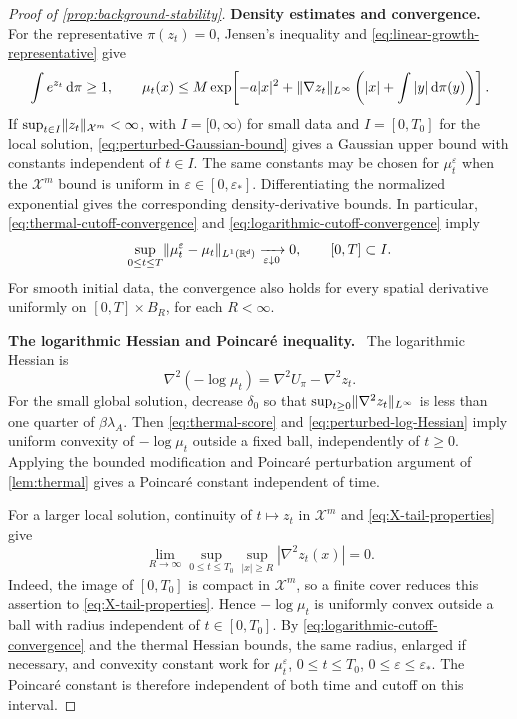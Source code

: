 \documentclass[11pt,reqno]{amsart}
\numberwithin{equation}{section}
\theoremstyle{plain}
\theoremstyle{remark}
\DeclarePairedDelimiter{\norm}{\lVert}{\rVert}
\renewcommand{\d}{\mathsf{d}}\newcommand{\s}{\mathsf{s}}
\newcommand{\parheading}[1]{\par\medskip\noindent\textbf{#1}\ }
\newcommand{\Xspace}{\mathcal X}
\begin{document}
\begin{proof}[Proof of \cref{prop:background-stability}]
\parheading{Density estimates and convergence.}
For the representative $\pi(z_t)=0$, Jensen's inequality and \eqref{eq:linear-growth-representative} give
\begin{equation}\label{eq:perturbed-Gaussian-bound}
 \int e^{z_t}\dd\pi\ge1,
 \qquad
 \mu_t(x)\le M\exp\!\left[-a|x|^2+
      \norm{\nabla z_t}_{L^\infty}\left(|x|+\int|y|\dd\pi(y)\right)\right].
\end{equation}
If $\sup_{t\in I}\norm{z_t}_{\Xspace^m}<\infty$, with $I=[0,\infty)$ for small data and $I=[0,T_0]$ for the local solution, \eqref{eq:perturbed-Gaussian-bound} gives a Gaussian upper bound with constants independent of $t\in I$. The same constants may be chosen for $\mu_t^\varepsilon$ when the $\Xspace^m$ bound is uniform in $\varepsilon\in[0,\varepsilon_*]$. Differentiating the normalized exponential gives the corresponding density-derivative bounds. In particular, \eqref{eq:thermal-cutoff-convergence} and \eqref{eq:logarithmic-cutoff-convergence} imply
\begin{equation}\label{eq:density-cutoff-L1-explicit}
 \sup_{0\le t\le T}\norm{\mu_t^\varepsilon-\mu_t}_{L^1(\R^\d)}
 \xrightarrow[\varepsilon\downarrow0]{}0,
 \qquad [0,T]\subset I.
\end{equation}
For smooth initial data, the convergence also holds for every spatial derivative uniformly on $[0,T]\times B_R$, for each $R<\infty$.

\parheading{The logarithmic Hessian and Poincar\'e inequality.}
The logarithmic Hessian is
\begin{equation}\label{eq:perturbed-log-Hessian}
 \nabla^2(-\log\mu_t)=\nabla^2U_\pi-\nabla^2z_t.
\end{equation}
For the small global solution, decrease $\delta_0$ so that $\sup_{t\ge0}\norm{\nabla^2z_t}_{L^\infty}$ is less than one quarter of $\beta\lambda_A$. Then \eqref{eq:thermal-score} and \eqref{eq:perturbed-log-Hessian} imply uniform convexity of $-\log\mu_t$ outside a fixed ball, independently of $t\ge0$. Applying the bounded modification and Poincar\'e perturbation argument of \cref{lem:thermal} gives a Poincar\'e constant independent of time.

For a larger local solution, continuity of $t\mapsto z_t$ in $\Xspace^m$ and \eqref{eq:X-tail-properties} give
\begin{equation}\label{eq:local-trajectory-uniform-Hessian-tail}
 \lim_{R\to\infty}\sup_{0\le t\le T_0}\sup_{|x|\ge R}
            |\nabla^2z_t(x)|=0.
\end{equation}
Indeed, the image of $[0,T_0]$ is compact in $\Xspace^m$, so a finite cover reduces this assertion to \eqref{eq:X-tail-properties}. Hence $-\log\mu_t$ is uniformly convex outside a ball with radius independent of $t\in[0,T_0]$. By \eqref{eq:logarithmic-cutoff-convergence} and the thermal Hessian bounds, the same radius, enlarged if necessary, and convexity constant work for $\mu_t^\varepsilon$, $0\le t\le T_0$, $0\le\varepsilon\le\varepsilon_*$. The Poincar\'e constant is therefore independent of both time and cutoff on this interval.


\end{proof}
\end{document}
